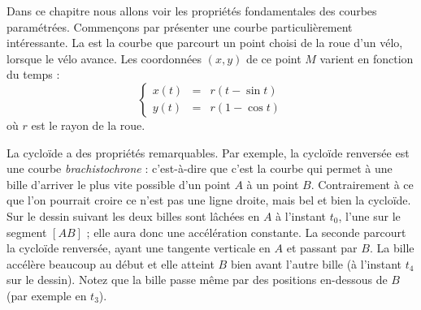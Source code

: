 \documentclass[class=report,crop=false]{standalone}
\begin{document}









\bigskip

Dans ce chapitre nous allons voir les propriétés fondamentales des courbes paramétrées.
Commençons par présenter une courbe particulièrement intéressante.
La  est la courbe que parcourt un point choisi de la roue d'un vélo,
lorsque le vélo avance. Les coordonnées $(x,y)$ de ce point $M$ varient
en fonction du temps :
$$\left\{\begin{array}{rcl}
x(t) &=& r(t-\sin t) \\
y(t) &=& r(1-\cos t)
\end{array} \right.$$
où $r$ est le rayon de la roue.


La cycloïde a des propriétés remarquables. Par exemple, la
cycloïde renversée est une courbe \emph{brachistochrone} :
c'est-à-dire que c'est la courbe
qui permet à une bille d'arriver le plus vite possible d'un point $A$ à un point $B$.
Contrairement à ce que l'on pourrait croire ce n'est pas
une ligne droite, mais bel et bien la cycloïde.
Sur le dessin suivant les deux billes sont lâchées en $A$ à l'instant $t_0$,
l'une sur le segment $[AB]$ ; elle aura donc une accélération constante.
La seconde parcourt la cycloïde renversée, ayant une tangente verticale en $A$ et passant par $B$.
La bille accélère beaucoup au début et elle atteint $B$ bien avant l'autre bille
(à l'instant $t_4$ sur le dessin).
Notez que la bille passe même par des positions en-dessous de $B$ (par exemple en $t_3$).

\end{document}
